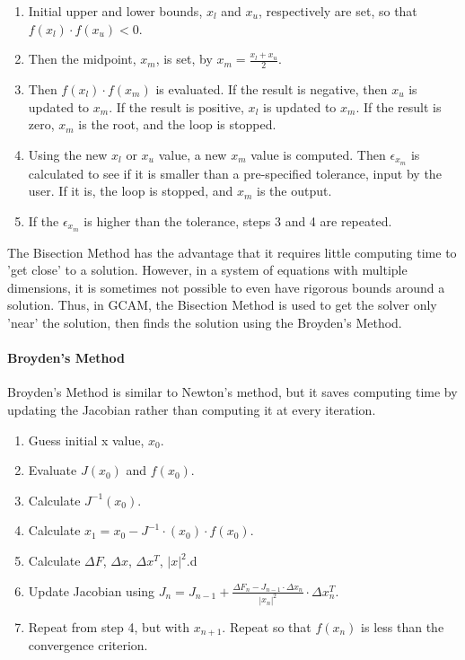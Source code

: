 \begin{enumerate}
	\item Initial upper and lower bounds, $x_l$ and $x_u$, respectively are set,
	so that $f(x_l) \cdot f(x_u) <0 $.
	\item Then the midpoint, $x_m$, is set, by $x_m = \frac{x_l+x_u}{2}$.
	\item Then $f(x_l) \cdot f(x_m)$ is evaluated. If the result is negative,
	then $x_u$ is updated to $x_m$. If the result is positive, $x_l$ is updated
	to $x_m$. If the result is zero, $x_m$ is the root, and the loop is stopped.
	\item Using the new $x_l$ or $x_u$ value, a new $x_m$ value is computed. Then
	$\epsilon_{x_m}$ is calculated to see if it is smaller than a pre-specified tolerance,
	input by the user. If it is, the loop is stopped, and $x_m$ is the output.
	\item If the $\epsilon_{x_m}$ is higher than the tolerance, steps 3 and 4 are repeated.
\end{enumerate}


The Bisection Method has the advantage that it requires little computing time
to 'get close' to a solution. However, in a system of equations with multiple
dimensions, it is sometimes not possible to even have rigorous bounds around 
a solution. Thus, in \gls{GCAM}, the Bisection Method is used to get the 
solver only 'near' the solution, then finds the solution using the Broyden's Method.

\paragraph{Broyden's Method}
Broyden's Method is similar to Newton's method, but it saves computing 
time by updating the Jacobian rather than computing it at every iteration. 

\begin{enumerate}
\item Guess initial x value, $x_0$.
\item Evaluate $J(x_0)$ and $f(x_0)$.
\item Calculate $J^{-1}(x_0).$
\item Calculate $x_1 = x_0-J^{-1} \cdot (x_0) \cdot f(x_0)$.
\item Calculate $\Delta F$, $\Delta x$, $\Delta x^T$, $|x|^2$.d
\item Update Jacobian using $J_n = J_{n-1}+ \frac{\Delta F_n - J_{n-1} \cdot \Delta
	 x_n}{|x_n|^2} \cdot \Delta x_n^T $.
\item Repeat from step 4, but with $x_{n+1}$. Repeat so that $f(x_n)$ is less than the 
convergence criterion.
\end{enumerate}

